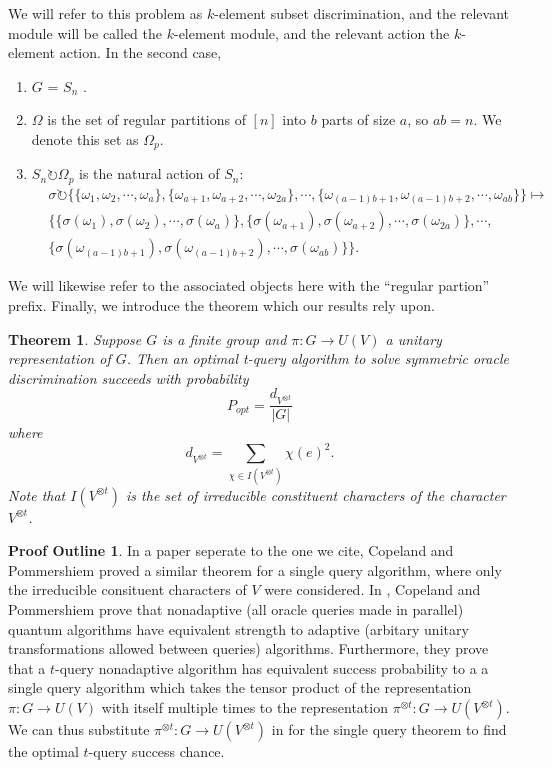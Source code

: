 \documentclass[12pt,twoside]{reedthesis}
\theoremstyle{plain}   %
\newtheorem{thm}{Theorem}[section] %
\theoremstyle{definition}
\newtheorem{outline}{Proof Outline}[section]
\theoremstyle{remark}
\numberwithin{equation}{section}
\def\acts{\circlearrowright} %
\begin{document}
  We will refer to this problem as $k$-element subset discrimination, and the relevant module will be called the $k$-element module, and the relevant action the $k$-element action.
  In the second case,
  \begin{enumerate}
  \item $G$ = $S_n$ .
  \item $\Omega$ is the set of regular partitions of $[n]$ into $b$ parts of size $a$, so $ab = n$. We denote this set as $\Omega_p$.
  \item $S_n \acts \Omega_p$ is the natural action of $S_n$:
    \begin{align*}
      &\sigma \acts \{ \{ \omega_1, \omega_2, \cdots, \omega_a \}, \{ \omega_{a+1}, \omega_{a+2}, \cdots, \omega_{2a} \}, \cdots, \{ \omega_{(a-1)b + 1}, \omega_{(a-1)b + 2}, \cdots, \omega_{ab} \}  \} \mapsto &\\
      &\{ \{ \sigma(\omega_1), \sigma(\omega_2), \cdots, \sigma(\omega_a )\}, \{ \sigma(\omega_{a+1}), \sigma(\omega_{a+2}), \cdots, \sigma(\omega_{2a}) \}, \cdots, \\
      & \{ \sigma(\omega_{(a-1)b + 1}), \sigma(\omega_{(a-1)b + 2}), \cdots, \sigma(\omega_{ab}) \} \}.
    \end{align*}
  \end{enumerate}
  We will likewise refer to the associated objects here with the ``regular partion'' prefix.
  Finally, we introduce the theorem which our results rely upon.
  \begin{thm}
    Suppose $G$ is a finite group and $\pi : G \to U (V )$ a unitary representation of $G$. Then
    an optimal t-query algorithm to solve symmetric oracle discrimination succeeds with probability
    \[ P_{opt} = \dfrac{d_{V^{\otimes t}}}{|G|} \]
    where
    \[ d_{V^{\otimes t}} = \sum_{\chi \in I(V^{\otimes t})} \chi (e)^2.\]
    Note that $I(V^{\otimes t})$ is the set of irreducible constituent characters of the character $V^{\otimes t}$.
  \end{thm}
  \begin{outline}
    In a paper seperate to the one we cite, Copeland and Pommershiem proved a similar theorem for a single query algorithm, where only the irreducible consituent characters of $V$ were considered.
    In \cite{copeland}, Copeland and Pommershiem prove that nonadaptive (all oracle queries made in parallel) quantum algorithms have equivalent strength to adaptive (arbitary unitary transformations allowed between queries)
    algorithms.
    Furthermore, they prove that a $t$-query nonadaptive algorithm has equivalent success probability to a a single query algorithm which takes the tensor product of the representation $\pi:G \to U(V)$ with itself multiple times to the
    representation $\pi^{\otimes t}:G \to U(V^{ \otimes t})$.
    We can thus substitute $\pi^{\otimes t}:G \to U(V^{ \otimes t})$ in for the single query theorem to find the optimal $t$-query success chance.
  \end{outline}
\end{document}
